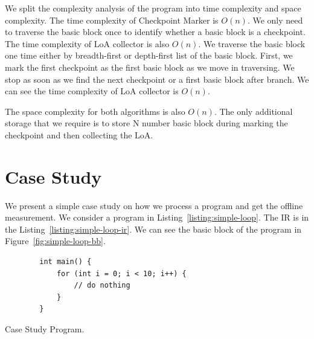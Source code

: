 We split the complexity analysis of the program into time complexity and space
complexity. The time complexity of Checkpoint Marker is $O(n)$. We only need to
traverse the basic block once to identify whether a basic block is a checkpoint.
The time complexity of LoA collector is also $O(n)$. We traverse the basic block
one time either by breadth-first or depth-first list of the basic block. First,
we mark the first checkpoint as the first basic block as we move in traversing.
We stop as soon as we find the next checkpoint or a first basic block after
branch. We can see the time complexity of LoA collector is $O(n)$.

The space complexity for both algorithms is also $O(n)$. The only additional
storage that we require is to store N number basic block during marking the
checkpoint and then collecting the LoA.

\section{Case Study}

We present a simple case study on how we process a program and
get the offline measurement. We consider a program in
Listing~\ref{listing:simple-loop}. The IR is in the
Listing~\ref{listing:simple-loop-ir}. We can see the basic block of the program
in Figure~\ref{fig:simple-loop-bb}. 


\begin{listing}[h]
    \begin{verbatim}
        int main() {
            for (int i = 0; i < 10; i++) {
                // do nothing
            }
        }
    \end{verbatim}
    \caption{Case Study Program.}    
    \label{listing:simple-loop}
\end{listing}


